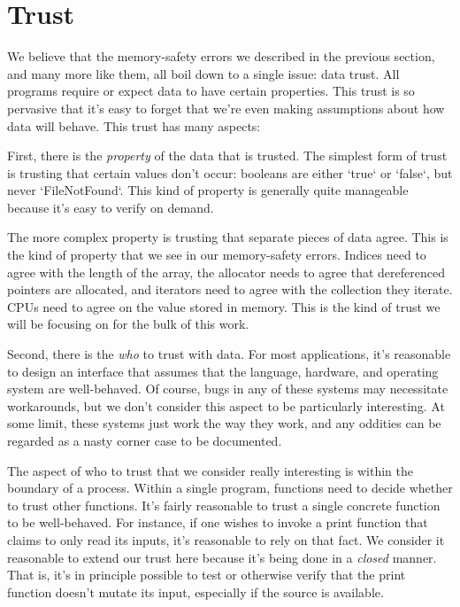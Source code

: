 \chapter{Trust}
\label{ch:trust}

We believe that the memory-safety errors we described in the previous
section, and many more like them, all boil down to a single issue: data trust.
All programs require or expect data to have certain properties. This trust
is so pervasive that it's easy to forget that we're even making assumptions about
how data will behave. This trust has many aspects:




First, there is the \emph{property} of the data that is trusted. The simplest form of
trust is trusting that certain values don't occur: booleans are either `true`
or `false`, but never `FileNotFound`. This kind of property is generally quite
manageable because it's easy to verify on demand.

The more complex property is trusting that separate pieces of data agree.
This is the kind of property that we see in our memory-safety errors. Indices need
to agree with the length of the array, the allocator needs to agree that
dereferenced pointers are allocated, and iterators need to agree with the collection
they iterate. CPUs need to agree on the value stored in memory. This is the kind of
trust we will be focusing on for the bulk of this work.




Second, there is the \emph{who} to trust with data. For most applications, it's
reasonable to design an interface that assumes that the language, hardware, and
operating system are well-behaved. Of course, bugs in any of these systems
may necessitate workarounds, but we don't consider this aspect to be particularly
interesting. At some limit, these systems just work the way they work, and any
oddities can be regarded as a nasty corner case to be documented.

The aspect of who to trust that we consider really interesting is within the
boundary of a process. Within a single program, functions need to decide whether
to trust other functions. It's fairly reasonable to trust a single concrete
function to be well-behaved. For instance, if one wishes to invoke a print
function that claims to only read its inputs, it's reasonable to rely on that
fact. We consider it reasonable to extend our trust here because it's being done
in a \emph{closed} manner. That is, it's in principle possible to test or otherwise
verify that the print function doesn't mutate its input, especially if the
source is available.

